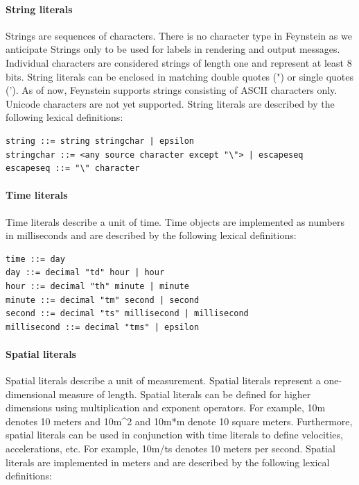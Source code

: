 \paragraph{String literals}

Strings are sequences of characters. There is no character type in
Feynstein as we anticipate Strings only to be used for labels in
rendering and output messages. Individual characters are considered
strings of length one and represent at least 8 bits. String literals
can be enclosed in matching double quotes (") or single quotes (').
As of now, Feynstein supports strings consisting of ASCII characters
only. Unicode characters are not yet supported. String literals are
described by the following lexical definitions:

\begin{verbatim}
string ::= string stringchar | epsilon
stringchar ::= <any source character except "\"> | escapeseq
escapeseq ::= "\" character
\end{verbatim}

\paragraph{Time literals}
 
Time literals describe a unit of time. Time objects are implemented as
numbers in milliseconds and are described by the following lexical
definitions:

\begin{verbatim}
time ::= day
day ::= decimal "td" hour | hour
hour ::= decimal "th" minute | minute
minute ::= decimal "tm" second | second
second ::= decimal "ts" millisecond | millisecond 
millisecond ::= decimal "tms" | epsilon
\end{verbatim}

\paragraph{Spatial literals}
 
Spatial literals describe a unit of measurement. Spatial literals
represent a one-dimensional measure of length. Spatial literals can be
defined for higher dimensions using multiplication and exponent
operators. For example, 10m denotes 10 meters and
10m\textasciicircum{}2 and 10m*m denote 10 square meters. Furthermore,
spatial literals can be used in conjunction with time literals to
define velocities, accelerations, etc. For example, 10m/ts denotes 10
meters per second. Spatial literals are implemented in meters and are
described by the following lexical definitions:

